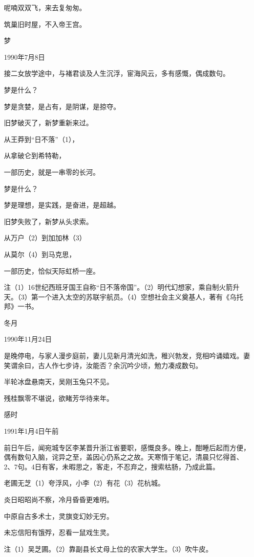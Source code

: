 \documentclass[../../dazhuan.tex]{subfiles}
\begin{document}
呢喃双双飞，来去复匆匆。

筑巢旧时屋，不入帝王宫。



梦

1990年7月8日

接二女放学途中，与褚君谈及人生沉浮，宦海风云，多有感慨，偶成数句。

梦是什么？

梦是贪婪，是占有，是阴谋，是掠夺。

旧梦破灭了，新梦重新来过。

从王莽到“日不落”（1），

从拿破仑到希特勒，

一部历史，就是一串零的长河。



梦是什么？

梦是理想，是实践，是奋进，是超越。

旧梦失败了，新梦从头求索。

从万户（2）到加加林（3）

从莫尔（4）到马克思，

一部历史，恰似天际虹桥一座。

注（1）16世纪西班牙国王自称“日不落帝国”。（2）明代幻想家，乘自制火箭升天。（3）第一个进入太空的苏联宇航员。（4）空想社会主义奠基人，著有《乌托邦》一书。



冬月

1990年11月24日

是晚停电，与家人漫步庭前，妻儿见新月清光如洗，稚兴勃发，竞相吟诵嬉戏。妻笑谓余曰，古人作七步诗，汝能否？余沉吟少顷，勉力凑成数句。

半轮冰盘悬南天，吴刚玉兔只不见。

残桂飘零不堪说，欲睹芳华待来年。



感时

1991年1月4日午前

前日午后，闻宛城专区李某晋升浙江省要职，感慨良多。晚上，酣睡后起而方便，偶有数句入脑，诧异之至，盖因心仍系之之故。天寒惰于笔记，清晨只忆得首、2、7句。4日有客，未暇思之，客走，不忍弃之，搜索枯肠，乃成此篇。

老圃无芝（1）夸浮风，小李（2）有花（3）花杭城。

炎日昭昭尚不察，冷月昏昏更难明。

中原自古多术士，灵旗变幻妙无穷。

未忘信阳有饿殍，忍看一鼠戏生灵。

注（1）吴芝圃。（2）靠副县长丈母上位的农家大学生。（3）吹牛皮。
\end{document}

